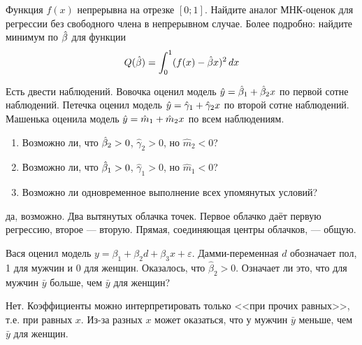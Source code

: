 \documentclass[pdftex,11pt,openany]{book}\usepackage[]{graphicx}\usepackage[]{color}
\begin{document}
\begin{problem}
 Функция $f(x)$ непрерывна на отрезке $[0;1]$. Найдите аналог МНК-оценок для регрессии без свободного члена в непрерывном случае. Более подробно: найдите минимум по $\hat{\beta}$ для функции
\begin{equation}
Q(\hat{\beta})= \int_0^1 (f(x)-\hat{\beta} x)^2\,dx
\end{equation}
\end{problem}

\begin{solution}
\end{solution}


\begin{problem}
 Есть двести наблюдений. Вовочка оценил модель $\hat{y}=\hat{\beta}_1+\hat{\beta}_2 x$ по первой сотне наблюдений. Петечка оценил модель $\hat{y}=\hat{\gamma}_1+\hat{\gamma}_2 x$ по второй сотне наблюдений. Машенька оценила модель $\hat{y}=\hat{m}_1+\hat{m}_2 x$ по всем наблюдениям.
\begin{enumerate}
\item Возможно ли, что $\hat{\beta}_2>0$, $\hat{\gamma}_2>0$, но $\hat{m}_2<0$?
\item Возможно ли, что $\hat{\beta}_1>0$, $\hat{\gamma}_1>0$, но $\hat{m}_1<0$?
\item Возможно ли одновременное выполнение всех упомянутых условий?
\end{enumerate}
\end{problem}

\begin{solution}
да, возможно. Два вытянутых облачка точек. Первое облачко даёт первую регрессию, второе --- вторую. Прямая, соединяющая центры облачков, --- общую.
\end{solution}



\begin{problem}
 Вася оценил модель $y=\beta_1+\beta_2 d+\beta_3 x+\varepsilon$. Дамми-переменная $d$ обозначает пол, 1 для мужчин и 0 для женщин. Оказалось, что $\hat{\beta}_2>0$. Означает ли это, что для мужчин $\bar{y}$ больше, чем $\bar{y}$ для женщин?
\end{problem}

\begin{solution}
Нет. Коэффициенты можно интерпретировать только <<при прочих равных>>, т.е. при равных $x$. Из-за разных $x$ может оказаться, что у мужчин $\bar{y}$ меньше, чем $\bar{y}$ для женщин.
\end{solution}
\end{document}
